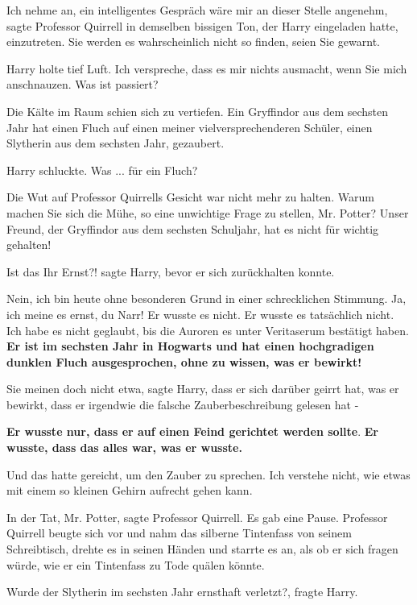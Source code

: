 \glqq Ich nehme an, ein intelligentes Gespräch wäre mir an dieser Stelle
angenehm\grqq{}, sagte Professor Quirrell in demselben bissigen Ton, der Harry
eingeladen hatte, einzutreten. \glqq Sie werden es wahrscheinlich nicht so
finden, seien Sie gewarnt.\grqq{}

Harry holte tief Luft. \glqq Ich verspreche, dass es mir nichts ausmacht, wenn
Sie mich anschnauzen. Was ist passiert?\grqq{}

Die Kälte im Raum schien sich zu vertiefen. \glqq Ein Gryffindor aus dem
sechsten Jahr hat einen Fluch auf einen meiner vielversprechenderen Schüler,
einen Slytherin aus dem sechsten Jahr, gezaubert.\grqq{}

Harry schluckte. \glqq Was ... für ein Fluch?\grqq{}

Die Wut auf Professor Quirrells Gesicht war nicht mehr zu halten. \glqq Warum
machen Sie sich die Mühe, so eine unwichtige Frage zu stellen, Mr. Potter? Unser
Freund, der Gryffindor aus dem sechsten Schuljahr, hat es nicht für wichtig
gehalten!\grqq{}

\glqq Ist das Ihr Ernst?!\grqq{} sagte Harry, bevor er sich zurückhalten konnte.

\glqq Nein, ich bin heute ohne besonderen Grund in einer schrecklichen Stimmung.
Ja, ich meine es ernst, du Narr! Er wusste es nicht. Er wusste es tatsächlich
nicht. Ich habe es nicht geglaubt, bis die Auroren es unter Veritaserum
bestätigt haben. \textbf{Er ist im sechsten Jahr in Hogwarts und hat einen
hochgradigen dunklen Fluch ausgesprochen, ohne zu wissen, was er
bewirkt!}\grqq{}

\glqq Sie meinen doch nicht etwa\grqq{}, sagte Harry, \glqq dass er sich darüber
geirrt hat, was er bewirkt, dass er irgendwie die falsche Zauberbeschreibung
gelesen hat -\grqq{}

\glqq \textbf{Er wusste nur, dass er auf einen Feind gerichtet werden
sollte}.\textbf{ Er wusste, dass das alles war, was er wusste.}\grqq{}

Und das hatte gereicht, um den Zauber zu sprechen. \glqq Ich verstehe nicht, wie
etwas mit einem so kleinen Gehirn aufrecht gehen kann.\grqq{}

\glqq In der Tat, Mr. Potter\grqq{}, sagte Professor Quirrell. Es gab eine
Pause. Professor Quirrell beugte sich vor und nahm das silberne Tintenfass von
seinem Schreibtisch, drehte es in seinen Händen und starrte es an, als ob er
sich fragen würde, wie er ein Tintenfass zu Tode quälen könnte.

\glqq Wurde der Slytherin im sechsten Jahr ernsthaft verletzt?\grqq{}, fragte
Harry.

